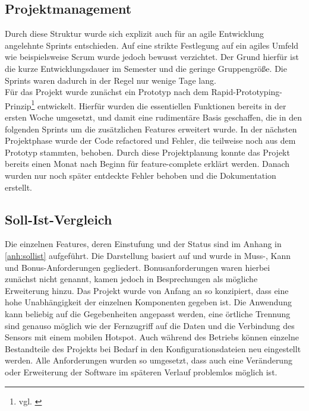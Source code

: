\subsection{Projektmanagement}
Durch diese Struktur wurde sich explizit auch für an agile Entwicklung angelehnte Sprints entschieden.
Auf eine strikte Festlegung auf ein agiles Umfeld wie beispielsweise Scrum wurde jedoch bewusst verzichtet.
Der Grund hierfür ist die kurze Entwicklungsdauer im Semester und die geringe Gruppengröße.
Die Sprints waren dadurch in der Regel nur wenige Tage lang. \\
Für das Projekt wurde zunächst ein Prototyp nach dem Rapid-Prototyping-Prinzip\footnote{vgl. \cite{krypczyk.2019}} entwickelt.
Hierfür wurden die essentiellen Funktionen bereits in der ersten Woche umgesetzt, und damit eine rudimentäre Basis geschaffen, die in den folgenden Sprints um die zusätzlichen Features erweitert wurde.
In der nächsten Projektphase wurde der Code refactored und Fehler, die teilweise noch aus dem Prototyp stammten, behoben.
Durch diese Projektplanung konnte das Projekt bereits einen Monat nach Beginn für feature-complete erklärt werden.
Danach wurden nur noch später entdeckte Fehler behoben und die Dokumentation erstellt.

\subsection{Soll-Ist-Vergleich}
Die einzelnen Features, deren Einstufung und der Status sind im Anhang in \autoref{anh:sollist} aufgeführt.
Die Darstellung basiert auf \cite{Wortmann.2020} und wurde in Muss-, Kann und Bonus-Anforderungen gegliedert. Bonusanforderungen waren hierbei zunächst nicht genannt, kamen jedoch in Besprechungen als mögliche Erweiterung hinzu.
Das Projekt wurde von Anfang an so konzipiert, dass eine hohe Unabhängigkeit der einzelnen Komponenten gegeben ist.
Die Anwendung kann beliebig auf die Gegebenheiten angepasst werden, eine örtliche Trennung sind genauso möglich wie der Fernzugriff auf die Daten und die Verbindung des Sensors mit einem mobilen Hotspot.
Auch während des Betriebs können einzelne Bestandteile des Projekts bei Bedarf in den Konfigurationsdateien neu eingestellt werden.
Alle Anforderungen wurden so umgesetzt, dass auch eine Veränderung oder Erweiterung der Software im späteren Verlauf problemlos möglich ist. 